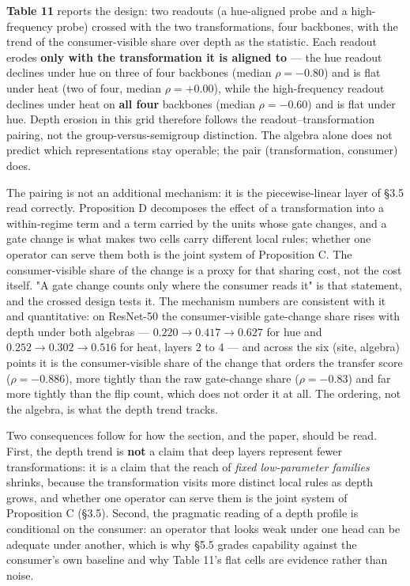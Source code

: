 \textbf{Table 11} reports the design: two readouts (a hue-aligned probe and a high-frequency probe) crossed with the two transformations, four backbones, with the trend of the consumer-visible share over depth as the statistic. Each readout erodes \textbf{only with the transformation it is aligned to} --- the hue readout declines under hue on three of four backbones (median $\rho=-0.80$) and is flat under heat (two of four, median $\rho=+0.00$), while the high-frequency readout declines under heat on \textbf{all four} backbones (median $\rho=-0.60$) and is flat under hue. Depth erosion in this grid therefore follows the readout--transformation pairing, not the group-versus-semigroup distinction. The algebra alone does not predict which representations stay operable; the pair (transformation, consumer) does.

The pairing is not an additional mechanism: it is the piecewise-linear layer of \S{}3.5 read correctly. Proposition D decomposes the effect of a transformation into a within-regime term and a term carried by the units whose gate changes, and a gate change is what makes two cells carry different local rules; whether one operator can serve them both is the joint system of Proposition C. The consumer-visible share of the change is a proxy for that sharing cost, not the cost itself. "A gate change counts only where the consumer reads it" is that statement, and the crossed design tests it. The mechanism numbers are consistent with it and quantitative: on ResNet-50 the consumer-visible gate-change share rises with depth under both algebras --- $0.220\to0.417\to0.627$ for hue and $0.252\to0.302\to0.516$ for heat, layers 2 to 4 --- and across the six (site, algebra) points it is the consumer-visible share of the change that orders the transfer score ($\rho=-0.886$), more tightly than the raw gate-change share ($\rho=-0.83$) and far more tightly than the flip count, which does not order it at all. The ordering, not the algebra, is what the depth trend tracks.

Two consequences follow for how the section, and the paper, should be read. First, the depth trend is \textbf{not} a claim that deep layers represent fewer transformations: it is a claim that the reach of \textit{fixed low-parameter families} shrinks, because the transformation visits more distinct local rules as depth grows, and whether one operator can serve them is the joint system of Proposition C (\S{}3.5). Second, the pragmatic reading of a depth profile is conditional on the consumer: an operator that looks weak under one head can be adequate under another, which is why \S{}5.5 grades capability against the consumer's own baseline and why Table 11's flat cells are evidence rather than noise.

